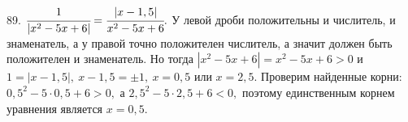 89. $\cfrac{1}{|x^2-5x+6|}=\cfrac{|x-1,5|}{x^2-5x+6}.$ У левой дроби положительны и числитель, и знаменатель, а у правой точно положителен числитель, а значит должен быть положителен и знаменатель. Но тогда $|x^2-5x+6|=x^2-5x+6>0$ и $1=|x-1,5|,\ x-1,5=\pm1,\ x=0,5$ или $x=2,5.$ Проверим найденные корни: $0,5^2-5\cdot0,5+6>0,$ а $2,5^2-5\cdot2,5+6<0,$ поэтому единственным корнем уравнения является $x=0,5.$\\
